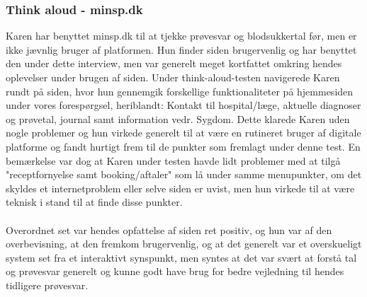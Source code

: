 \subsubsection*{Think aloud - minsp.dk}
Karen har benyttet minsp.dk til at tjekke prøvesvar og blodsukkertal før, men er ikke jævnlig bruger af platformen. Hun finder siden brugervenlig og har benyttet den under dette interview, men var generelt meget kortfattet omkring hendes oplevelser under brugen af siden. Under think-aloud-testen navigerede Karen rundt på siden, hvor hun gennemgik forskellige funktionaliteter på hjemmesiden under vores forespørgsel, heriblandt: Kontakt til hospital/læge, aktuelle diagnoser og prøvetal, journal samt information vedr. Sygdom. Dette klarede Karen uden nogle problemer og hun virkede generelt til at være en rutineret bruger af digitale platforme og fandt hurtigt frem til de punkter som fremlagt under denne test. En bemærkelse var dog at Karen under testen havde lidt problemer med at tilgå "receptfornyelse samt booking/aftaler" som lå under samme menupunkter, om det skyldes et internetproblem eller selve siden er uvist, men hun virkede til at være teknisk i stand til at finde disse punkter. 
\\ \\
Overordnet set var hendes opfattelse af siden ret positiv, og hun var af den overbevisning, at den fremkom brugervenlig, og at det generelt var et overskueligt system set fra et interaktivt synspunkt, men syntes at det var svært at forstå tal og prøvesvar generelt og kunne godt have brug for bedre vejledning til hendes tidligere prøvesvar.
